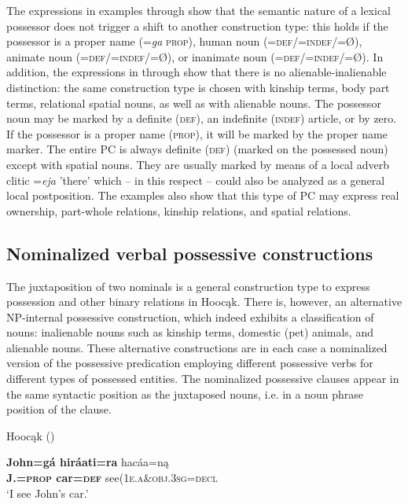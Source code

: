 \documentclass[output=paper]{LSP/langsci}
\begin{document}
The expressions in examples  through  show that the semantic nature of a lexical possessor does not trigger a shift to another construction type: this holds if the possessor is a proper name (=\textit{ga} \textsc{prop}), human noun (=\textsc{def/=indef/}=Ø), animate noun (=\textsc{def/=indef}/=Ø), or inanimate noun (=\textsc{def/=indef}/=Ø). In addition, the expressions in  through  show that there is no alienable-inalienable distinction: the same construction type is chosen with kinship terms, body part terms, relational spatial nouns, as well as with alienable nouns. The possessor noun may be marked by a definite (\textsc{def}), an indefinite (\textsc{indef}) article, or by zero. If the possessor is a proper name (\textsc{prop}), it will be marked by the proper name marker. The entire PC is always definite (\textsc{def}) (marked on the possessed noun) except with spatial nouns. They are usually marked by means of a local adverb clitic =\textit{eja} 'there' which – in this respect – could also be analyzed as a general local postposition. The examples also show that this type of PC may express real ownership, part-whole relations, kinship relations, and spatial relations.
 
\subsection{Nominalized verbal possessive constructions}\label{sec:helmbrecht:3.2} \label{nomvposs}

The juxtaposition of two nominals is a general construction type to express possession and other binary relations in Hoocąk. There is, however, an alternative NP-internal possessive construction, which indeed exhibits a classification of nouns: inalienable nouns such as kinship terms, domestic (pet) animals, and alienable nouns. These alternative constructions are in each case a nominalized version of the possessive predication employing different possessive verbs for different types of possessed entities. The nominalized possessive clauses appear in the same syntactic position as the juxtaposed nouns, i.e. in a noun phrase position of the clause. 

\ea Hoocąk (\citealt[16]{Helmbrecht2003}) \label{seecar}

\ea 
\gll \textbf{John=g\'a hir\'aati=ra}  hac\'aa=n\k{a} \\
\textbf{J.=\textsc{prop} car=\textsc{def}} see(\textsc{1e.a}\&\textsc{obj.3sg}=\textsc{decl} \\
\glt `I see John's car.'  
\end{document}
